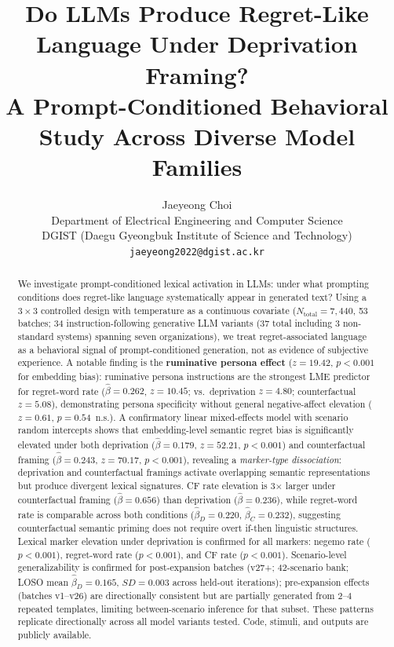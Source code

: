 \documentclass[11pt]{article}
\begin{document}
\title{Do LLMs Produce Regret-Like Language Under Deprivation Framing? \\
A Prompt-Conditioned Behavioral Study Across Diverse Model Families}

\author{Jaeyeong Choi \\
  Department of Electrical Engineering and Computer Science \\
  DGIST (Daegu Gyeongbuk Institute of Science and Technology) \\
  \texttt{jaeyeong2022@dgist.ac.kr}}

\date{}

\maketitle

\begin{abstract}
We investigate prompt-conditioned lexical activation in LLMs: under what prompting conditions does regret-like language systematically appear in generated text?
Using a $3 \times 3$ controlled design with temperature as a continuous covariate ($N_\text{total}=7{,}440$, 53 batches; 34 instruction-following generative LLM variants (37 total including 3 non-standard systems) spanning seven organizations), we treat regret-associated language as a behavioral signal of prompt-conditioned generation, not as evidence of subjective experience.
A notable finding is the \textbf{ruminative persona effect} ($z=19.42$, $p<0.001$ for embedding bias): ruminative persona instructions are the strongest LME predictor for regret-word rate ($\hat{\beta}=0.262$, $z=10.45$; vs.\ deprivation $z=4.80$; counterfactual $z=5.08$), demonstrating persona specificity without general negative-affect elevation ($z=0.61$, $p=0.54$~n.s.).
A confirmatory linear mixed-effects model with scenario random intercepts shows that embedding-level semantic regret bias is significantly elevated under both deprivation ($\hat{\beta}=0.179$, $z=52.21$, $p<0.001$) and counterfactual framing ($\hat{\beta}=0.243$, $z=70.17$, $p<0.001$), revealing a \emph{marker-type dissociation}: deprivation and counterfactual framings activate overlapping semantic representations but produce divergent lexical signatures. CF rate elevation is 3$\times$ larger under counterfactual framing ($\hat{\beta}=0.656$) than deprivation ($\hat{\beta}=0.236$), while regret-word rate is comparable across both conditions ($\hat{\beta}_D=0.220$, $\hat{\beta}_C=0.232$), suggesting counterfactual semantic priming does not require overt if-then linguistic structures.
Lexical marker elevation under deprivation is confirmed for all markers: negemo rate ($p<0.001$), regret-word rate ($p<0.001$), and CF rate ($p<0.001$).
Scenario-level generalizability is confirmed for post-expansion batches (v27+; 42-scenario bank; LOSO mean $\hat{\beta}_D=0.165$, $SD=0.003$ across held-out iterations); pre-expansion effects (batches v1--v26) are directionally consistent but are partially generated from 2--4 repeated templates, limiting between-scenario inference for that subset.
These patterns replicate directionally across all model variants tested.
Code, stimuli, and outputs are publicly available.
\end{abstract}
\end{document}
